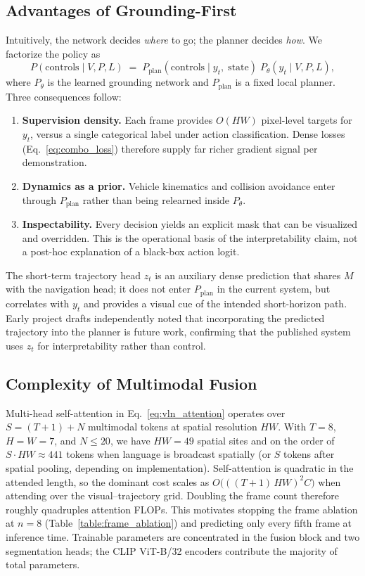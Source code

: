 \subsection{Advantages of Grounding-First}

Intuitively, the network decides \emph{where} to go; the planner decides \emph{how}. We factorize the policy as
\begin{equation}
    P(\mathrm{controls}\mid V,P,L) \;=\; P_{\mathrm{plan}}(\mathrm{controls}\mid y_t,\;\mathrm{state})\; P_\theta(y_t\mid V,P,L),
\end{equation}
where $P_\theta$ is the learned grounding network and $P_{\mathrm{plan}}$ is a fixed local planner. Three consequences follow:

\begin{enumerate}
    \item \textbf{Supervision density.} Each frame provides $O(HW)$ pixel-level targets for $y_t$, versus a single categorical label under action classification. Dense losses (Eq.~\ref{eq:combo_loss}) therefore supply far richer gradient signal per demonstration.
    \item \textbf{Dynamics as a prior.} Vehicle kinematics and collision avoidance enter through $P_{\mathrm{plan}}$ rather than being relearned inside $P_\theta$.
    \item \textbf{Inspectability.} Every decision yields an explicit mask that can be visualized and overridden. This is the operational basis of the interpretability claim, not a post-hoc explanation of a black-box action logit.
\end{enumerate}

The short-term trajectory head $z_t$ is an auxiliary dense prediction that shares $M$ with the navigation head; it does not enter $P_{\mathrm{plan}}$ in the current system, but correlates with $y_t$ and provides a visual cue of the intended short-horizon path. Early project drafts independently noted that incorporating the predicted trajectory into the planner is future work, confirming that the published system uses $z_t$ for interpretability rather than control.

\subsection{Complexity of Multimodal Fusion}

Multi-head self-attention in Eq.~\ref{eq:vln_attention} operates over $S=(T{+}1)+N$ multimodal tokens at spatial resolution $HW$. With $T=8$, $H=W=7$, and $N\le 20$, we have $HW=49$ spatial sites and on the order of $S\cdot HW \approx 441$ tokens when language is broadcast spatially (or $S$ tokens after spatial pooling, depending on implementation). Self-attention is quadratic in the attended length, so the dominant cost scales as $O\bigl(((T{+}1)\,HW)^2 C\bigr)$ when attending over the visual--trajectory grid. Doubling the frame count therefore roughly quadruples attention FLOPs. This motivates stopping the frame ablation at $n=8$ (Table~\ref{table:frame_ablation}) and predicting only every fifth frame at inference time. Trainable parameters are concentrated in the fusion block and two segmentation heads; the CLIP ViT-B/32 encoders contribute the majority of total parameters.

